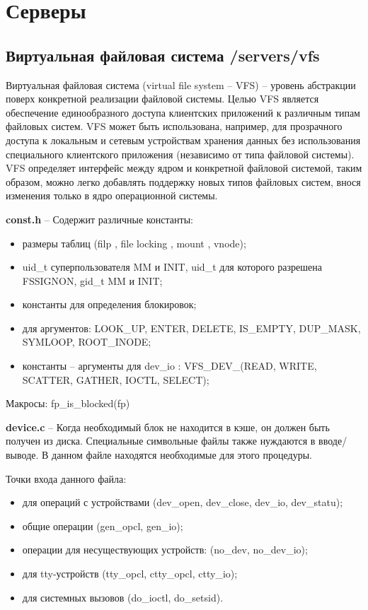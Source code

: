 \newpage
\section{Серверы}

\subsection{Виртуальная файловая система /servers/vfs}

Виртуальная файловая система (virtual file system -- VFS) -- уровень абстракции поверх конкретной реализации файловой системы. Целью VFS является обеспечение единообразного доступа клиентских приложений к различным типам файловых систем. VFS может быть использована, например, для прозрачного доступа к локальным и сетевым устройствам хранения данных без использования специального клиентского приложения (независимо от типа файловой системы). VFS определяет интерфейс между ядром и конкретной файловой системой, таким образом, можно легко добавлять поддержку новых типов файловых систем, внося изменения только в ядро операционной системы.

\textbf{const.h} -- Содержит различные константы:
\begin{itemize}
\item размеры таблиц (filp , file locking , mount , vnode);
\item uid\_t суперпользователя MM и INIT, uid\_t для которого разрешена FSSIGNON, gid\_t  MM и INIT;
\item константы для определения блокировок;
\item для аргументов: LOOK\_UP, ENTER, DELETE, IS\_EMPTY, DUP\_MASK, SYMLOOP, ROOT\_INODE;
\item константы -- аргументы для dev\_io : VFS\_DEV\_(READ, WRITE, SCATTER, GATHER, IOCTL, SELECT);
\end{itemize}

Макросы: fp\_is\_blocked(fp)

\textbf{device.c} -- Когда необходимый блок не находится в кэше, он должен быть получен из диска. Специальные символьные файлы также нуждаются в вводе/выводе. В данном файле находятся необходимые для этого процедуры.

Точки входа данного файла:
\begin{itemize}
\item для операций с устройствами (dev\_open, dev\_close, dev\_io, dev\_statu);
\item общие операции (gen\_opcl, gen\_io);
\item операции для несуществующих устройств: (no\_dev, no\_dev\_io);
\item для tty-устройств (tty\_opcl, ctty\_opcl, ctty\_io);
\item для системных вызовов (do\_ioctl, do\_setsid).
\end{itemize}

